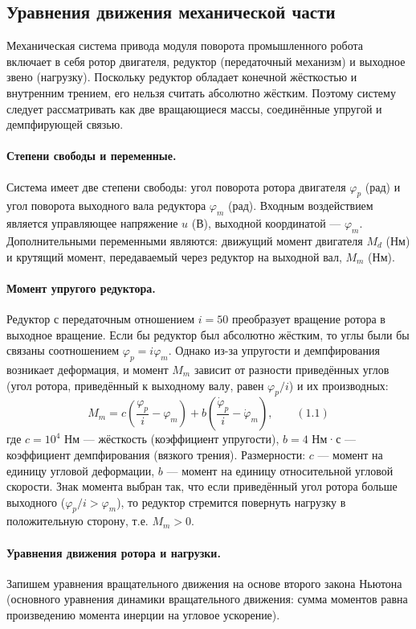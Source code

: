 \documentclass[a4paper, 14pt]{extarticle}
\begin{document}
    \subsection{Уравнения движения механической части}
    Механическая система привода модуля поворота промышленного робота включает в себя ротор двигателя, редуктор (передаточный механизм) и выходное звено (нагрузку). Поскольку редуктор обладает конечной жёсткостью и внутренним трением, его нельзя считать абсолютно жёстким. Поэтому систему следует рассматривать как две вращающиеся массы, соединённые упругой и демпфирующей связью.

    \paragraph{Степени свободы и переменные.}
    Система имеет две степени свободы: угол поворота ротора двигателя $\varphi_p$ (рад) и угол поворота выходного вала редуктора $\varphi_m$ (рад). Входным воздействием является управляющее напряжение $u$ (В), выходной координатой — $\varphi_m$. Дополнительными переменными являются: движущий момент двигателя $M_d$ (Нм) и крутящий момент, передаваемый через редуктор на выходной вал, $M_m$ (Нм).

    \paragraph{Момент упругого редуктора.}
    Редуктор с передаточным отношением $i = 50$ преобразует вращение ротора в выходное вращение. Если бы редуктор был абсолютно жёстким, то углы были бы связаны соотношением $\varphi_p = i \varphi_m$. Однако из-за упругости и демпфирования возникает деформация, и момент $M_m$ зависит от разности приведённых углов (угол ротора, приведённый к выходному валу, равен $\varphi_p/i$) и их производных:
    \[
    M_m = c\left(\frac{\varphi_p}{i} - \varphi_m\right) + b\left(\frac{\dot{\varphi}_p}{i} - \dot{\varphi}_m\right),
    \qquad (1.1)
    \]
    где $c = 10^4$ Нм — жёсткость (коэффициент упругости), $b = 4$ Нм·с — коэффициент демпфирования (вязкого трения). Размерности: $c$ — момент на единицу угловой деформации, $b$ — момент на единицу относительной угловой скорости. Знак момента выбран так, что если приведённый угол ротора больше выходного ($\varphi_p/i > \varphi_m$), то редуктор стремится повернуть нагрузку в положительную сторону, т.е. $M_m > 0$.

    \paragraph{Уравнения движения ротора и нагрузки.}
    Запишем уравнения вращательного движения на основе второго закона Ньютона (основного уравнения динамики вращательного движения: сумма моментов равна произведению момента инерции на угловое ускорение).
\end{document}
